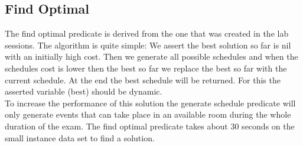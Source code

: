 \documentclass[11pt]{article}
\begin{document}
\subsection{Find Optimal}
The find optimal predicate is derived from the one that was created in the lab sessions. The algorithm is quite simple: We assert the best solution so far is nil with an initially high cost. Then we generate all possible schedules and when the schedules cost is lower then the best so far we replace the best so far with the current schedule. At the end the best schedule will be returned. For this the asserted variable (best) should be dynamic.\\
To increase the performance of this solution the generate schedule predicate will only generate events that can take place in an available room during the whole duration of the exam. The find optimal predicate takes about 30 seconds on the small instance data set to find a solution.
\end{document}
